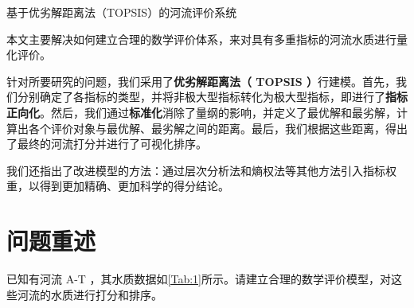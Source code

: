 \documentclass[withoutpreface]{cumcmthesis}
\begin{document}
    \begin{abstractpage}{基于优劣解距离法（TOPSIS）的河流评价系统}
            
        本文主要解决如何建立合理的数学评价体系，来对具有多重指标的河流水质进行量化评价。

        针对所要研究的问题，我们采用了\textbf{优劣解距离法（ TOPSIS ）}行建模。首先，我们分别确定了各指标的类型，并将非极大型指标转化为极大型指标，即进行了\textbf{指标正向化}。然后，我们通过\textbf{标准化}消除了量纲的影响，并定义了最优解和最劣解，计算出各个评价对象与最优解、最劣解之间的距离。最后，我们根据这些距离，得出了最终的河流打分并进行了可视化排序。

        我们还指出了改进模型的方法：通过层次分析法和熵权法等其他方法引入指标权重，以得到更加精确、更加科学的得分结论。


    \end{abstractpage}

    \tocpage

    \section{问题重述}

    已知有河流 A-T ，其水质数据如\cref{Tab:1}所示。请建立合理的数学评价模型，对这些河流的水质进行打分和排序。
\end{document}
